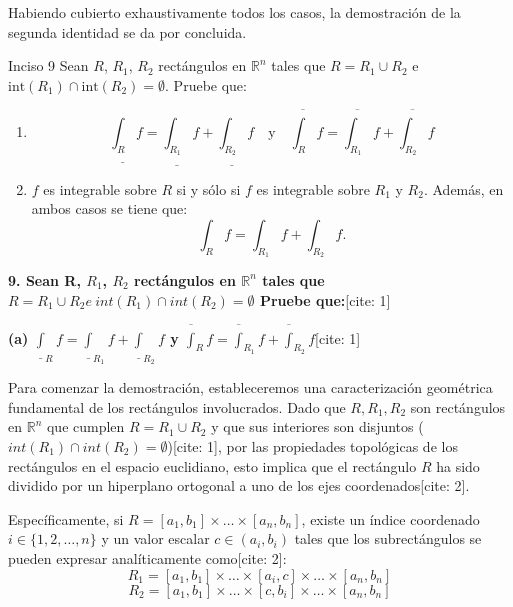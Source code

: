 \documentclass[11pt,letterpaper]{article}
\begin{document}
Habiendo cubierto exhaustivamente todos los casos, la demostración de la segunda identidad se da por concluida.

\begin{inciso}{Inciso 9}
Sean $R$, $R_{1}$, $R_{2}$ rectángulos en $\mathbb{R}^{n}$ tales que $R=R_{1}\cup R_{2}$ e $\text{int}(R_{1})\cap \text{int}(R_{2})=\emptyset$. Pruebe que:
\begin{enumerate}[label=\alph*)]
    \item 
    \begin{equation*}
        \underline{\int_{R}}f=\underline{\int_{R_{1}}}f+\underline{\int_{R_{2}}}f \quad \text{y} \quad \overline{\int_{R}}f=\overline{\int_{R_{1}}}f+\overline{\int_{R_{2}}}f
    \end{equation*}
    \item $f$ es integrable sobre $R$ si y sólo si $f$ es integrable sobre $R_{1}$ y $R_{2}$. Además, en ambos casos se tiene que:
    \begin{equation*}
        \int_{R}f=\int_{R_{1}}f+\int_{R_{2}}f.
    \end{equation*}
\end{enumerate}
\end{inciso}

\textbf{9. Sean R, $R_{1}$, $R_{2}$ rectángulos en $\mathbb{R}^{n}$ tales que $R=R_{1}\cup R_{2} e~int(R_{1})\cap int(R_{2})=\emptyset$ Pruebe que:}[cite: 1]

\textbf{(a) $\underline{\int}_{R}f=\underline{\int}_{R_{1}}f+\underline{\int}_{R_{2}}f$ y $\overline{\int}_{R}f=\overline{\int}_{R_{1}}f+\overline{\int}_{R_{2}}f$}[cite: 1]

Para comenzar la demostración, estableceremos una caracterización geométrica fundamental de los rectángulos involucrados. Dado que $R, R_{1}, R_{2}$ son rectángulos en $\mathbb{R}^{n}$ que cumplen $R = R_{1} \cup R_{2}$ y que sus interiores son disjuntos ($int(R_{1}) \cap int(R_{2}) = \emptyset$)[cite: 1], por las propiedades topológicas de los rectángulos en el espacio euclidiano, esto implica que el rectángulo $R$ ha sido dividido por un hiperplano ortogonal a uno de los ejes coordenados[cite: 2].

Específicamente, si $R = [a_{1}, b_{1}] \times \dots \times [a_{n}, b_{n}]$, existe un índice coordenado $i \in \{1, 2, \dots, n\}$ y un valor escalar $c \in (a_{i}, b_{i})$ tales que los subrectángulos se pueden expresar analíticamente como[cite: 2]:
\begin{equation*}
R_{1} = [a_{1}, b_{1}] \times \dots \times [a_{i}, c] \times \dots \times [a_{n}, b_{n}]
\end{equation*}
\begin{equation*}
R_{2} = [a_{1}, b_{1}] \times \dots \times [c, b_{i}] \times \dots \times [a_{n}, b_{n}]
\end{equation*}
\end{document}
